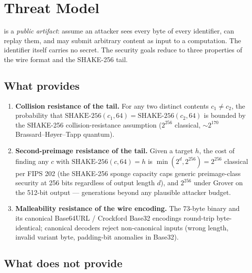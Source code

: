 \section{Threat Model}
\label{sec:threat-model}

\tesserahash{} is a \emph{public artifact}: assume an attacker sees every byte of every identifier, can replay them, and may submit arbitrary content as input to a \tesserahash{} computation. The identifier itself carries no secret. The security goals reduce to three properties of the wire format and the SHAKE-256 \citep{fips202} tail.

\subsection{What \tesserahash{} provides}

\begin{enumerate}
  \item \textbf{Collision resistance of the tail.} For any two distinct contents $c_1 \ne c_2$, the probability that $\mathrm{SHAKE\text{-}256}(c_1, 64) = \mathrm{SHAKE\text{-}256}(c_2, 64)$ is bounded by the SHAKE-256 collision-resistance assumption ($2^{256}$ classical, $\sim 2^{170}$ Brassard--H{\o}yer--Tapp \citep{bht1998} quantum).
  \item \textbf{Second-preimage resistance of the tail.} Given a target $h$, the cost of finding any $c$ with $\mathrm{SHAKE\text{-}256}(c, 64) = h$ is $\min(2^{d}, 2^{256}) = 2^{256}$ classical per FIPS 202 \citep{fips202} (the SHAKE-256 sponge capacity caps generic preimage-class security at 256 bits regardless of output length $d$), and $2^{256}$ under Grover \citep{grover1996} on the 512-bit output --- generations beyond any plausible attacker budget.
  \item \textbf{Malleability resistance of the wire encoding.} The 73-byte binary and its canonical Base64URL / Crockford Base32 encodings round-trip byte-identical; canonical decoders reject non-canonical inputs (wrong length, invalid variant byte, padding-bit anomalies in Base32).
\end{enumerate}

\subsection{What \tesserahash{} does not provide}

